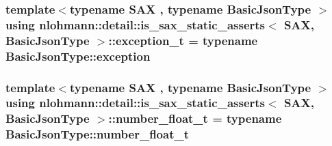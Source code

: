 \subsubsection[{\texorpdfstring{exception\+\_\+t}{exception_t}}]{\setlength{\rightskip}{0pt plus 5cm}template$<$typename S\+AX , typename Basic\+Json\+Type $>$ using {\bf nlohmann\+::detail\+::is\+\_\+sax\+\_\+static\+\_\+asserts}$<$ S\+AX, Basic\+Json\+Type $>$\+::{\bf exception\+\_\+t} =  typename Basic\+Json\+Type\+::exception\hspace{0.3cm}{\ttfamily [private]}}\hypertarget{structnlohmann_1_1detail_1_1is__sax__static__asserts_a34e1bc8ab7adbbab5f7d8c45a964020b}{}\label{structnlohmann_1_1detail_1_1is__sax__static__asserts_a34e1bc8ab7adbbab5f7d8c45a964020b}
\subsubsection[{\texorpdfstring{number\+\_\+float\+\_\+t}{number_float_t}}]{\setlength{\rightskip}{0pt plus 5cm}template$<$typename S\+AX , typename Basic\+Json\+Type $>$ using {\bf nlohmann\+::detail\+::is\+\_\+sax\+\_\+static\+\_\+asserts}$<$ S\+AX, Basic\+Json\+Type $>$\+::{\bf number\+\_\+float\+\_\+t} =  typename Basic\+Json\+Type\+::number\+\_\+float\+\_\+t\hspace{0.3cm}{\ttfamily [private]}}\hypertarget{structnlohmann_1_1detail_1_1is__sax__static__asserts_a65d4be40c41ddc31fd2c3583d87d5faf}{}\label{structnlohmann_1_1detail_1_1is__sax__static__asserts_a65d4be40c41ddc31fd2c3583d87d5faf}
